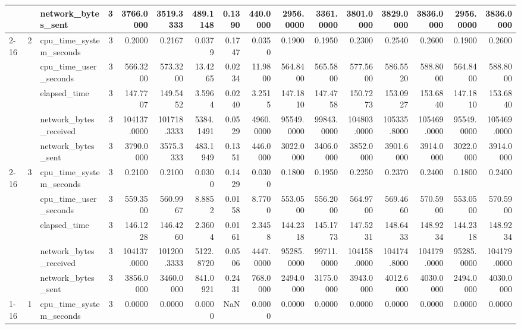 \begin{tabular}{lllrrrrrrrrrrrrr}
 &  & network\_bytes\_sent & 3 & 3766.0000 & 3519.3333 & 489.1148 & 0.1390 & 440.0000 & 2956.0000 & 3361.0000 & 3801.0000 & 3829.0000 & 3836.0000 & 2956.0000 & 3836.0000 \\
\cline{2-16}
 & \multirow[t]{5}{*}{2} & cpu\_time\_system\_seconds & 3 & 0.2000 & 0.2167 & 0.0379 & 0.1747 & 0.0350 & 0.1900 & 0.1950 & 0.2300 & 0.2540 & 0.2600 & 0.1900 & 0.2600 \\
 &  & cpu\_time\_user\_seconds & 3 & 566.3200 & 573.3200 & 13.4265 & 0.0234 & 11.9800 & 564.8400 & 565.5800 & 577.5600 & 586.5520 & 588.8000 & 564.8400 & 588.8000 \\
 &  & elapsed\_time & 3 & 147.7707 & 149.5452 & 3.5964 & 0.0240 & 3.2515 & 147.1810 & 147.4758 & 150.7273 & 153.0927 & 153.6840 & 147.1810 & 153.6840 \\
 &  & network\_bytes\_received & 3 & 104137.0000 & 101718.3333 & 5384.1491 & 0.0529 & 4960.0000 & 95549.0000 & 99843.0000 & 104803.0000 & 105335.8000 & 105469.0000 & 95549.0000 & 105469.0000 \\
 &  & network\_bytes\_sent & 3 & 3790.0000 & 3575.3333 & 483.1949 & 0.1351 & 446.0000 & 3022.0000 & 3406.0000 & 3852.0000 & 3901.6000 & 3914.0000 & 3022.0000 & 3914.0000 \\
\cline{2-16}
 & \multirow[t]{5}{*}{3} & cpu\_time\_system\_seconds & 3 & 0.2100 & 0.2100 & 0.0300 & 0.1429 & 0.0300 & 0.1800 & 0.1950 & 0.2250 & 0.2370 & 0.2400 & 0.1800 & 0.2400 \\
 &  & cpu\_time\_user\_seconds & 3 & 559.3500 & 560.9967 & 8.8852 & 0.0158 & 8.7700 & 553.0500 & 556.2000 & 564.9700 & 569.4660 & 570.5900 & 553.0500 & 570.5900 \\
 &  & elapsed\_time & 3 & 146.1228 & 146.4260 & 2.3604 & 0.0161 & 2.3458 & 144.2318 & 145.1773 & 147.5231 & 148.6433 & 148.9234 & 144.2318 & 148.9234 \\
 &  & network\_bytes\_received & 3 & 104137.0000 & 101200.3333 & 5122.8720 & 0.0506 & 4447.0000 & 95285.0000 & 99711.0000 & 104158.0000 & 104174.8000 & 104179.0000 & 95285.0000 & 104179.0000 \\
 &  & network\_bytes\_sent & 3 & 3856.0000 & 3460.0000 & 841.0921 & 0.2431 & 768.0000 & 2494.0000 & 3175.0000 & 3943.0000 & 4012.6000 & 4030.0000 & 2494.0000 & 4030.0000 \\
\cline{1-16} \cline{2-16}
\multirow[t]{15}{*}{national-scale-spatial-join-postgis-medium} & \multirow[t]{5}{*}{1} & cpu\_time\_system\_seconds & 3 & 0.0000 & 0.0000 & 0.0000 & NaN & 0.0000 & 0.0000 & 0.0000 & 0.0000 & 0.0000 & 0.0000 & 0.0000 & 0.0000 \\

\end{tabular}

